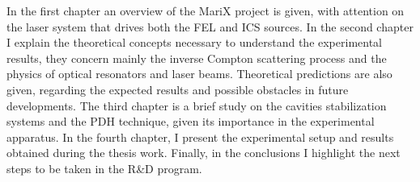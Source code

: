 In the first chapter an overview of the MariX project is given, with attention on the laser system that drives both the FEL and ICS sources. In the second chapter I explain the theoretical concepts necessary to understand the experimental results, they concern mainly the inverse Compton scattering process and the physics of optical resonators and laser beams. Theoretical predictions are also given, regarding the expected results and possible obstacles in future developments. The third chapter is a brief study on the cavities stabilization systems and the PDH technique, given its importance in the experimental apparatus. In the fourth chapter, I present the experimental setup and results obtained during the thesis work. Finally, in the conclusions I highlight the next steps to be taken in the R\&D program.

